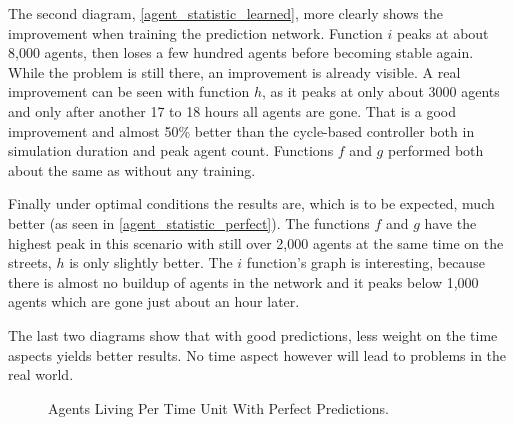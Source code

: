 The second diagram, \autoref{agent_statistic_learned}, more clearly shows the improvement when training the prediction network. Function $i$ peaks at about 8,000 agents, then loses a few hundred agents before becoming stable again. While the problem is still there, an improvement is already visible. A real improvement can be seen with function $h$, as it peaks at only about 3000 agents and only after another 17 to 18 hours all agents are gone. That is a good improvement and almost 50\% better than the cycle-based controller both in simulation duration and peak agent count. Functions $f$ and $g$ performed both about the same as without any training.

Finally under optimal conditions the results are, which is to be expected, much better (as seen in \autoref{agent_statistic_perfect}). The functions $f$ and $g$ have the highest peak in this scenario with still over 2,000 agents at the same time on the streets, $h$ is only slightly better. The $i$ function's graph is interesting, because there is almost no buildup of agents in the network and it peaks below 1,000 agents which are gone just about an hour later.

The last two diagrams show that with good predictions, less weight on the time aspects yields better results. No time aspect however will lead to problems in the real world. 

\begin{figure}[bt!]
	\centering
	\caption{Agents Living Per Time Unit With Perfect Predictions.}
	\label{agent_statistic_perfect}
\end{figure}
